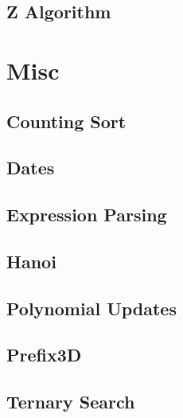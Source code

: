 \subsection{Z Algorithm}
\raggedbottom
\hrulefill

\section{Misc}
\subsection{Counting Sort}
\raggedbottom
\hrulefill
\subsection{Dates}
\raggedbottom
\hrulefill
\subsection{Expression Parsing}
\raggedbottom
\hrulefill
\subsection{Hanoi}
\raggedbottom
\hrulefill
\subsection{Polynomial Updates}
\raggedbottom
\hrulefill
\subsection{Prefix3D}
\raggedbottom
\hrulefill
\subsection{Ternary Search}
\raggedbottom
\hrulefill

